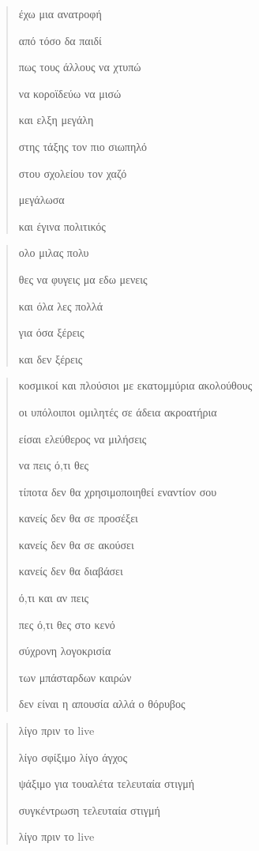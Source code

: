 \documentclass[12pt]{article}
\begin{document}
\begin{verse}
  έχω μια ανατροφή

  από τόσο δα παιδί

  πως τους άλλους να χτυπώ

  να κοροϊδεύω να μισώ



  και ελξη μεγάλη

  στης τάξης τον πιο σιωπηλό

  στου σχολείου τον χαζό

  μεγάλωσα

  και έγινα πολιτικός
\end{verse}

\begin{verse}
  ολο μιλας πολυ

  θες να φυγεις μα εδω μενεις

  και όλα λες πολλά

  για όσα ξέρεις

  και δεν ξέρεις

\end{verse}

\begin{verse}
  κοσμικοί και πλούσιοι με εκατομμύρια ακολούθους

  οι υπόλοιποι ομιλητές σε άδεια ακροατήρια

  είσαι ελεύθερος να μιλήσεις

  να πεις ό,τι θες

  τίποτα δεν θα χρησιμοποιηθεί εναντίον σου

  κανείς δεν θα σε προσέξει

  κανείς δεν θα σε ακούσει

  κανείς δεν θα διαβάσει

  ό,τι και αν πεις

  πες ό,τι θες στο κενό

  σύχρονη λογοκρισία

  των μπάσταρδων καιρών

  δεν είναι η απουσία αλλά ο θόρυβος
\end{verse}

\begin{verse}
  \greektext
  λίγο πριν το \latintext live

  \greektext
  λίγο σφίξιμο λίγο άγχος

  ψάξιμο για τουαλέτα τελευταία στιγμή

  συγκέντρωση τελευταία στιγμή

  λίγο πριν το \latintext live
\end{verse}
\end{document}
